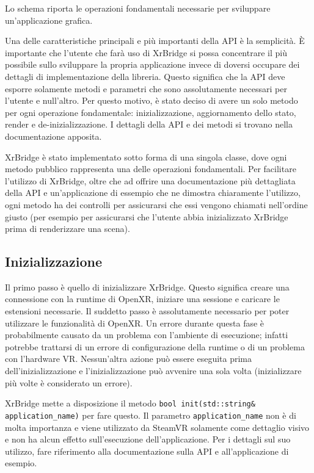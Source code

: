 \documentclass[twoside]{supsistudent}
\begin{document}
Lo schema riporta le operazioni fondamentali necessarie per sviluppare un'applicazione grafica.

Una delle caratteristiche principali e più importanti della API è la semplicità. È importante che l'utente che farà uso di XrBridge si possa concentrare il più possibile sullo sviluppare la propria applicazione invece di doversi occupare dei dettagli di implementazione della libreria. Questo significa che la API deve esporre solamente metodi e parametri che sono assolutamente necessari per l'utente e null'altro. Per questo motivo, è stato deciso di avere un solo metodo per ogni operazione fondamentale: inizializzazione, aggiornamento dello stato, render e de-inizializzazione. I dettagli della API e dei metodi si trovano nella documentazione apposita.

XrBridge è stato implementato sotto forma di una singola classe, dove ogni metodo pubblico rappresenta una delle operazioni fondamentali. Per facilitare l'utilizzo di XrBridge, oltre che ad offrire una documentazione più dettagliata della API e un'applicazione di essempio che ne dimostra chiaramente l'utilizzo, ogni metodo ha dei controlli per assicurarsi che essi vengono chiamati nell'ordine giusto (per esempio per assicurarsi che l'utente abbia inizializzato XrBridge prima di renderizzare una scena).

\subsection{Inizializzazione}

Il primo passo è quello di inizializzare XrBridge. Questo significa creare una connessione con la runtime di OpenXR, iniziare una sessione e caricare le estensioni necessarie. Il suddetto passo è assolutamente necessario per poter utilizzare le funzionalità di OpenXR. Un errore durante questa fase è probabilmente causato da un problema con l'ambiente di esecuzione; infatti potrebbe trattarsi di un errore di configurazione della runtime o di un problema con l'hardware VR. Nessun'altra azione può essere eseguita prima dell'inizializzazione e l'inizializzazione può avvenire una sola volta (inizializzare più volte è considerato un errore).

XrBridge mette a disposizione il metodo \texttt{bool init(std::string\& application\_name)} per fare questo. Il parametro \texttt{application\_name} non è di molta importanza e viene utilizzato da SteamVR solamente come dettaglio visivo e non ha alcun effetto sull'esecuzione dell'applicazione. Per i dettagli sul suo utilizzo, fare riferimento alla documentazione sulla API e all'applicazione di esempio.
\end{document}
